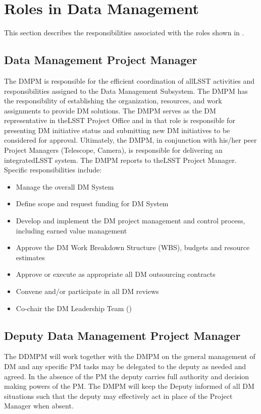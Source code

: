 \section{Roles in Data Management}

This section describes the responsibilities associated with the roles shown in
.


\subsection{Data Management Project Manager}\label{role:dmpm}

The \gls{DMPM} is responsible for the efficient coordination of allLSST activities and responsibilities assigned to the Data Management Subsystem. The \gls{DMPM} has the responsibility of establishing the organization, resources, and work assignments to provide DM solutions.  The \gls{DMPM} serves as the DM representative in theLSST Project Office and in that role is responsible for presenting DM initiative status and submitting new DM initiatives to be considered for approval. Ultimately, the \gls{DMPM}, in conjunction with his/her peer Project Managers (Telescope, \gls{Camera}), is responsible for delivering an integratedLSST system. The \gls{DMPM} reports to theLSST \gls{Project Manager}. Specific responsibilities include:

\begin{itemize}
\item Manage the overall DM System
\item Define scope and request funding for DM System
\item Develop and implement the DM project management and control process, including earned value management
\item Approve the DM \gls{Work Breakdown Structure} (\gls{WBS}), budgets and resource estimates
\item Approve or execute as appropriate all DM outsourcing contracts
\item Convene and/or participate in all DM reviews
\item Co-chair the DM Leadership Team ()
\end{itemize}

\subsection{Deputy Data Management Project Manager}\label{role:ddmpm}

The \gls{DDMPM} will work together with the \gls{DMPM} on the general management of DM and any specific PM tasks may be delegated to the deputy as needed and agreed. In the absence of the PM the deputy carries full authority and decision making powers of the PM.
The \gls{DMPM} will keep the Deputy informed of all DM situations such that the deputy may effectively act in place of the Project Manager when absent.

